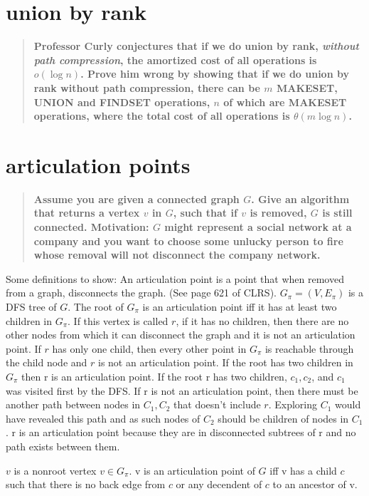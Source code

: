 \documentclass[titlepage]{article}\usepackage[]{graphicx}\usepackage[]{color}
\begin{document}
\section{union by rank}
\begin{quote}
  \textbf{Professor Curly conjectures that if we do union by rank,
\emph{without path compression}, the amortized cost of all operations
is $o(\log n)$.  Prove him wrong by showing that if we do union by
rank without path compression, there can be $m$ MAKESET, UNION and
FINDSET operations, $n$ of which are MAKESET operations, where the
total cost of all operations is $\theta(m \log n)$.}
\end{quote}



\section{articulation points}
\begin{quote}
  \textbf{Assume you are given a connected graph $G$.  Give an algorithm
that returns a vertex $v$ in $G$, such that if $v$ is removed, $G$ is
still connected.  Motivation: $G$ might represent a social network at
a company and you want to choose some unlucky person to fire whose
removal will not disconnect the company network.}
\end{quote}

Some definitions to show:
An articulation point is a point that when removed from a graph, disconnects
the graph. (See page 621 of CLRS).
$G_\pi = (V, E_\pi)$ is a DFS tree of $G$. 
The root of $G_\pi$ is an articulation point iff it has at least two children
in $G_\pi$. If this vertex is called $r$, if it has no children, then there are
no other nodes from which it can disconnect the graph and it is not an
articulation point. If $r$ has only one child, then every other point in
$G_\pi$ is reachable through the child node and $r$ is not an articulation
point. If the root has two children in $G_\pi$ then r is an articulation point.
If the root r has two children, $c_1, c_2$, and $c_1$ was visited first by the
DFS. If r is not an articulation point, then there must be another path between
nodes in $C_1, C_2$ that doesn't include $r$. Exploring $C_1$ would have revealed this
path and as such nodes of $C_2$ should be children of nodes in $C_1$. r is an
articulation point because they are in disconnected subtrees of r and no path
exists between them. 

$v$ is a nonroot vertex $v \in G_\pi$. v is an articulation point of $G$ iff v
has a child $c$ such that there is no back edge from $c$ or any decendent of
$c$ to an ancestor of v.
\end{document}
